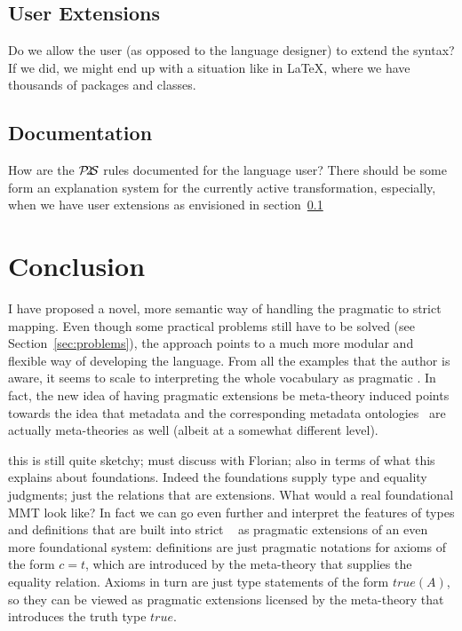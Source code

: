 \documentclass{article}
\def\ptos{\ensuremath{\mathcal{P}\kern-.2em2\kern-.2em\mathcal{S}}}
\begin{document}
\subsection{User Extensions}\label{sec:problems:ue}
Do we allow the user (as opposed to the language designer) to extend the syntax? If we
did, we might end up with a situation like in {\LaTeX}, where we have thousands of
{\omdoc} packages and classes.

\subsection{Documentation}
How are the {\ptos} rules documented for the language user? There should be some form an
explanation system for the currently active transformation, especially, when we have user
extensions as envisioned in section~\ref{sec:problems:ue}

\section{Conclusion}\label{sec:concl}

I have proposed a novel, more semantic way of handling the {} pragmatic to strict
mapping. Even though some practical problems still have to be solved (see
Section~\ref{sec:problems}), the approach points to a much more modular and flexible way
of developing the {\omdoc} language. From all the examples that the author is aware, it
seems to scale to interpreting the whole {} vocabulary as pragmatic
{}. In fact, the new idea of having pragmatic extensions be meta-theory induced
points towards the idea that {\omdoc} metadata and the corresponding metadata
ontologies~\cite{LK:MathOntoAuthDoc09} are actually meta-theories as well (albeit at a
somewhat different level).

\begin{newpart}{this is still quite sketchy; must discuss with Florian; also in terms of
    what this explains about foundations. Indeed the foundations supply type and equality
    judgments; just the relations that are extensions. What would a real foundational MMT
    look like?} In fact we can go even further and interpret the features of types and
  definitions that are built into strict {}~\cite{RabKoh:WSMSML09} as
  pragmatic extensions of an even more foundational system: definitions are just pragmatic
  notations for axioms of the form $c=t$, which are introduced by the meta-theory that supplies the
  equality relation. Axioms in turn are just type statements of the form $true(A)$, so
  they can be viewed as pragmatic extensions licensed by the meta-theory that introduces
  the truth type $true$. 
\end{newpart}
\printbibliography
\end{document}
